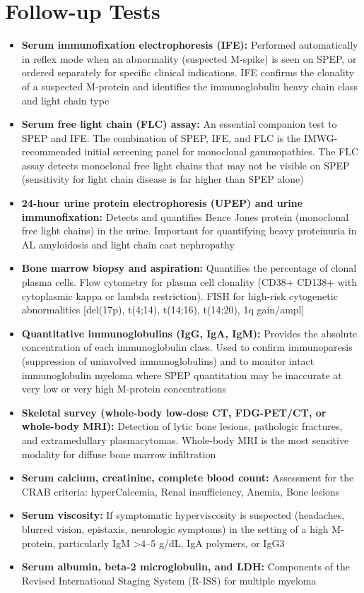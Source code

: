 \section*{Follow-up Tests}
\begin{itemize}
  \item \textbf{Serum immunofixation electrophoresis (IFE):} Performed automatically in reflex mode when an abnormality (suspected M-spike) is seen on SPEP, or ordered separately for specific clinical indications. IFE confirms the clonality of a suspected M-protein and identifies the immunoglobulin heavy chain class and light chain type
  \item \textbf{Serum free light chain (FLC) assay:} An essential companion test to SPEP and IFE. The combination of SPEP, IFE, and FLC is the IMWG-recommended initial screening panel for monoclonal gammopathies. The FLC assay detects monoclonal free light chains that may not be visible on SPEP (sensitivity for light chain disease is far higher than SPEP alone)
  \item \textbf{24-hour urine protein electrophoresis (UPEP) and urine immunofixation:} Detects and quantifies Bence Jones protein (monoclonal free light chains) in the urine. Important for quantifying heavy proteinuria in AL amyloidosis and light chain cast nephropathy
  \item \textbf{Bone marrow biopsy and aspiration:} Quantifies the percentage of clonal plasma cells. Flow cytometry for plasma cell clonality (CD38+ CD138+ with cytoplasmic kappa or lambda restriction). FISH for high-risk cytogenetic abnormalities [del(17p), t(4;14), t(14;16), t(14;20), 1q gain/ampl]
  \item \textbf{Quantitative immunoglobulins (IgG, IgA, IgM):} Provides the absolute concentration of each immunoglobulin class. Used to confirm immunoparesis (suppression of uninvolved immunoglobulins) and to monitor intact immunoglobulin myeloma where SPEP quantitation may be inaccurate at very low or very high M-protein concentrations
  \item \textbf{Skeletal survey (whole-body low-dose CT, FDG-PET/CT, or whole-body MRI):} Detection of lytic bone lesions, pathologic fractures, and extramedullary plasmacytomas. Whole-body MRI is the most sensitive modality for diffuse bone marrow infiltration
  \item \textbf{Serum calcium, creatinine, complete blood count:} Assessment for the CRAB criteria: hyperCalcemia, Renal insufficiency, Anemia, Bone lesions
  \item \textbf{Serum viscosity:} If symptomatic hyperviscosity is suspected (headaches, blurred vision, epistaxis, neurologic symptoms) in the setting of a high M-protein, particularly IgM >4--5 g/dL, IgA polymers, or IgG3
  \item \textbf{Serum albumin, beta-2 microglobulin, and LDH:} Components of the Revised International Staging System (R-ISS) for multiple myeloma
\end{itemize}

